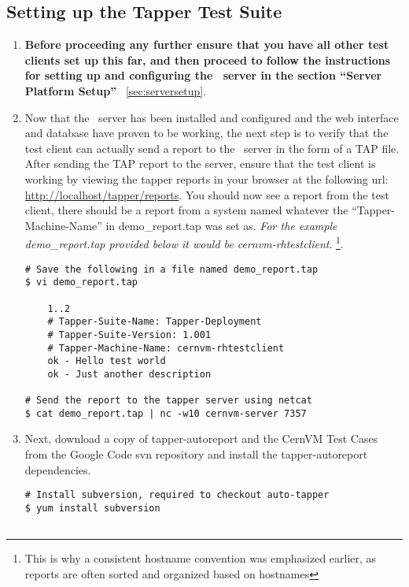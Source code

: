 \subsection{Setting up the Tapper Test Suite}
\label{sec:rhtestsuite}
\begin{enumerate}
\item 	{\bf Before proceeding any further ensure that you have all other test clients set up this far, and then proceed
		to follow the instructions for setting up and configuring the \tapper~server in the section ``Server Platform Setup''}		
		~\ref{sec:serversetup}.
		
\item 	Now that the \tapper~server has been installed and configured and the \tapper web interface and database have proven
		to be working, the next step is to verify that the test client can actually send a report to the \tapper~server in
		the form of a TAP file. After sending the TAP report to the server, ensure that the test client is working by viewing 
		the tapper reports in your browser at the following url: \url{http://localhost/tapper/reports}. You should now see a 
		report from the test client, there should be a report from a system named whatever the ``Tapper-Machine-Name'' in 
		demo\_report.tap was set as. \emph{For the example demo\_report.tap provided below it would be cernvm-rhtestclient}.
		\footnote{This is why a consistent hostname convention was emphasized earlier, as reports are often sorted and organized 
		based on hostnames}.
		
\lstset{caption= Send a Basic Report to the \tapper~Server}
\begin{lstlisting}
# Save the following in a file named demo_report.tap
$ vi demo_report.tap

	1..2
	# Tapper-Suite-Name: Tapper-Deployment
	# Tapper-Suite-Version: 1.001
	# Tapper-Machine-Name: cernvm-rhtestclient
	ok - Hello test world
	ok - Just another description

# Send the report to the tapper server using netcat
$ cat demo_report.tap | nc -w10 cernvm-server 7357
\end{lstlisting}

\item 	Next, download a copy of tapper-autoreport and the CernVM Test Cases from the Google Code svn repository
		\cite{GCreleasetesting} and install the tapper-autoreport dependencies.
		
\lstset{caption= Install \tapper~AutoReport and Dependencies}
\begin{lstlisting}
# Install subversion, required to checkout auto-tapper
$ yum install subversion


\end{lstlisting}
\end{enumerate}

